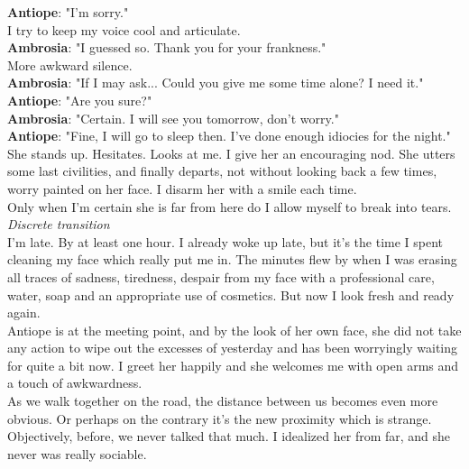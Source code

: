 \documentclass{report}
\newcommand{\dcomment}[1]{
	\emph{#1}
	\\
}
\newcommand{\speaker}[1]{
	\textbf{#1}: 
}
\begin{document}
\speaker{Antiope} "I'm sorry."\\

I try to keep my voice cool and articulate.\\

\speaker{Ambrosia} "I guessed so. Thank you for your frankness."\\

More awkward silence.\\

\speaker{Ambrosia} "If I may ask... Could you give me some time alone? I need it."\\

\speaker{Antiope} "Are you sure?"\\

\speaker{Ambrosia} "Certain. I will see you tomorrow, don't worry."\\

\speaker{Antiope} "Fine, I will go to sleep then. I've done enough idiocies for the night."\\

She stands up. Hesitates. Looks at me. I give her an encouraging nod. She utters some last civilities, and finally departs, not without looking back a few times, worry painted on her face. I disarm her with a smile each time.\\

Only when I'm certain she is far from here do I allow myself to break into tears.\\

\dcomment{
	Discrete transition
}

I'm late. By at least one hour. I already woke up late, but it's the time I spent cleaning my face which really put me in. The minutes flew by when I was erasing all traces of sadness, tiredness, despair from my face with a professional care, water, soap and an appropriate use of cosmetics. But now I look fresh and ready again.\\

Antiope is at the meeting point, and by the look of her own face, she did not take any action to wipe out the excesses of yesterday and has been worryingly waiting for quite a bit now. I greet her happily and she welcomes me with open arms and a touch of awkwardness.\\

As we walk together on the road, the distance between us becomes even more obvious. Or perhaps on the contrary it's the new proximity which is strange. Objectively, before, we never talked that much. I idealized her from far, and she never was really sociable.\\
\end{document}
